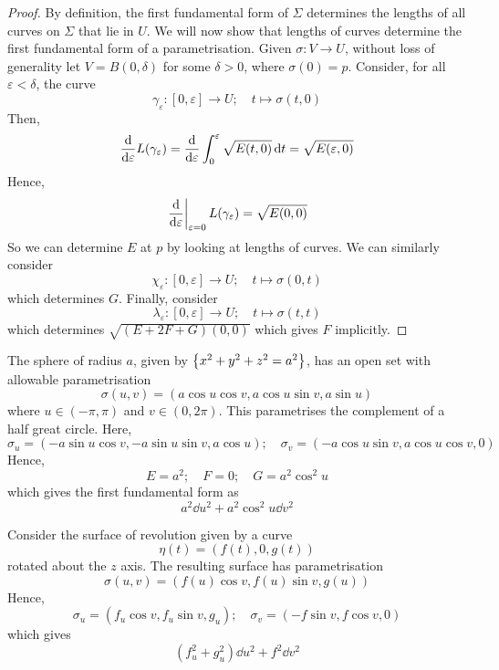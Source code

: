 \begin{proof}
	By definition, the first fundamental form of \( \Sigma \) determines the lengths of all curves on \( \Sigma \) that lie in \( U \).
	We will now show that lengths of curves determine the first fundamental form of a parametrisation.
	Given \( \sigma \colon V \to U \), without loss of generality let \( V = B(0,\delta) \) for some \( \delta > 0 \), where \( \sigma(0) = p \).
	Consider, for all \( \varepsilon < \delta \), the curve
	\[ \gamma_\varepsilon \colon [0,\varepsilon] \to U;\quad t \mapsto \sigma(t,0) \]
	Then,
	\[ \dv{\varepsilon} L(\gamma_\varepsilon) = \dv{\varepsilon} \int_0^\varepsilon \sqrt{E(t,0)} \dd{t} = \sqrt{E(\varepsilon,0)} \]
	Hence,
	\[ \eval{\dv{\varepsilon}}_{\varepsilon = 0} L(\gamma_\varepsilon) = \sqrt{E(0,0)} \]
	So we can determine \( E \) at \( p \) by looking at lengths of curves.
	We can similarly consider
	\[ \chi_\varepsilon \colon [0,\varepsilon] \to U;\quad t \mapsto \sigma(0,t) \]
	which determines \( G \).
	Finally, consider
	\[ \lambda_\varepsilon \colon [0,\varepsilon] \to U;\quad t \mapsto \sigma(t,t) \]
	which determines \( \sqrt{(E+2F+G)(0,0)} \) which gives \( F \) implicitly.
\end{proof}
\begin{example}
	The sphere of radius \( a \), given by \( \qty{x^2 + y^2 + z^2 = a^2} \), has an open set with allowable parametrisation
	\[ \sigma(u,v) = (a\cos u \cos v, a \cos u \sin v, a \sin u) \]
	where \( u \in (-\pi, \pi) \) and \( v \in (0,2\pi) \).
	This parametrises the complement of a half great circle.
	Here,
	\[ \sigma_u = (-a \sin u \cos v, -a \sin u \sin v, a \cos u);\quad \sigma_v = (-a \cos u \sin v, a \cos u \cos v, 0) \]
	Hence,
	\[ E = a^2; \quad F = 0;\quad G = a^2 \cos^2 u \]
	which gives the first fundamental form as
	\[ a^2 \dd{u}^2 + a^2 \cos^2 u \dd{v}^2 \]
\end{example}
\begin{example}
	Consider the surface of revolution given by a curve
	\[ \eta(t) = (f(t),0,g(t)) \]
	rotated about the \( z \) axis.
	The resulting surface has parametrisation
	\[ \sigma(u,v) = (f(u) \cos v, f(u) \sin v, g(u)) \]
	Hence,
	\[ \sigma_u = (f_u \cos v, f_u \sin v, g_u);\quad \sigma_v = (-f \sin v, f \cos v, 0) \]
	which gives
	\[ (f_u^2 + g_u^2) \dd{u}^2 + f^2 \dd{v}^2 \]
\end{example}
